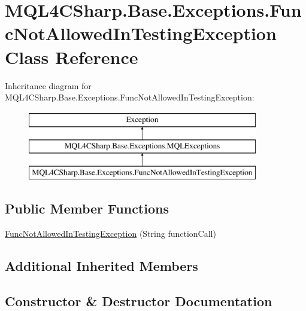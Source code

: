 \hypertarget{class_m_q_l4_c_sharp_1_1_base_1_1_exceptions_1_1_func_not_allowed_in_testing_exception}{}\section{M\+Q\+L4\+C\+Sharp.\+Base.\+Exceptions.\+Func\+Not\+Allowed\+In\+Testing\+Exception Class Reference}
\label{class_m_q_l4_c_sharp_1_1_base_1_1_exceptions_1_1_func_not_allowed_in_testing_exception}
Inheritance diagram for M\+Q\+L4\+C\+Sharp.\+Base.\+Exceptions.\+Func\+Not\+Allowed\+In\+Testing\+Exception\+:\begin{figure}[H]
\begin{center}
\leavevmode
\includegraphics[height=3.000000cm]{class_m_q_l4_c_sharp_1_1_base_1_1_exceptions_1_1_func_not_allowed_in_testing_exception}
\end{center}
\end{figure}
\subsection*{Public Member Functions}
\begin{DoxyCompactItemize}
\item 
\hyperlink{class_m_q_l4_c_sharp_1_1_base_1_1_exceptions_1_1_func_not_allowed_in_testing_exception_a7996a2e96ae33a505e33faece5b1ad00}{Func\+Not\+Allowed\+In\+Testing\+Exception} (String function\+Call)
\end{DoxyCompactItemize}
\subsection*{Additional Inherited Members}


\subsection{Constructor \& Destructor Documentation}
